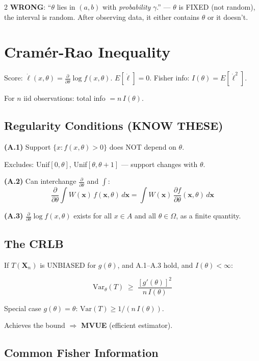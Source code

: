 \documentclass[8pt]{extarticle}
\begin{document}
\begin{multicols}{2}
\textbf{WRONG}: ``$\theta$ lies in $(a,b)$ with \emph{probability} $\gamma$.'' --- $\theta$ is FIXED (not random), the interval is random. After observing data, it either contains $\theta$ or it doesn't.

\section{Cram\'er-Rao Inequality}

Score: $\dot\ell(x,\theta) = \frac{\partial}{\partial\theta}\log f(x,\theta)$. \quad $E[\dot\ell] = 0$. \quad Fisher info: $I(\theta) = E[\dot\ell^2]$.

For $n$ iid observations: total info $= n\,I(\theta)$.

\subsection{Regularity Conditions (KNOW THESE)}

\textbf{(A.1)} Support $\{x : f(x,\theta) > 0\}$ does NOT depend on $\theta$.

\quad Excludes: Unif$[0,\theta]$, Unif$[\theta,\theta{+}1]$ --- support changes with $\theta$.

\textbf{(A.2)} Can interchange $\frac{\partial}{\partial\theta}$ and $\int$:
$$\frac{\partial}{\partial\theta}\int W(\mathbf{x})\,f(\mathbf{x},\theta)\,d\mathbf{x} = \int W(\mathbf{x})\,\frac{\partial f}{\partial\theta}(\mathbf{x},\theta)\,d\mathbf{x}$$

\textbf{(A.3)} $\frac{\partial}{\partial\theta}\log f(x,\theta)$ exists for all $x \in A$ and all $\theta \in \Omega$, as a finite quantity.

\subsection{The CRLB}

If $T(\mathbf{X}_n)$ is UNBIASED for $g(\theta)$, and A.1--A.3 hold, and $I(\theta) < \infty$:

$$\boxed{\text{Var}_\theta(T) \;\ge\; \frac{[g'(\theta)]^2}{n\,I(\theta)}}$$

Special case $g(\theta) = \theta$: \quad $\text{Var}(T) \ge 1/(n\,I(\theta))$.

Achieves the bound $\Rightarrow$ \textbf{MVUE} (efficient estimator).

\subsection{Common Fisher Information}


\end{multicols}
\end{document}
